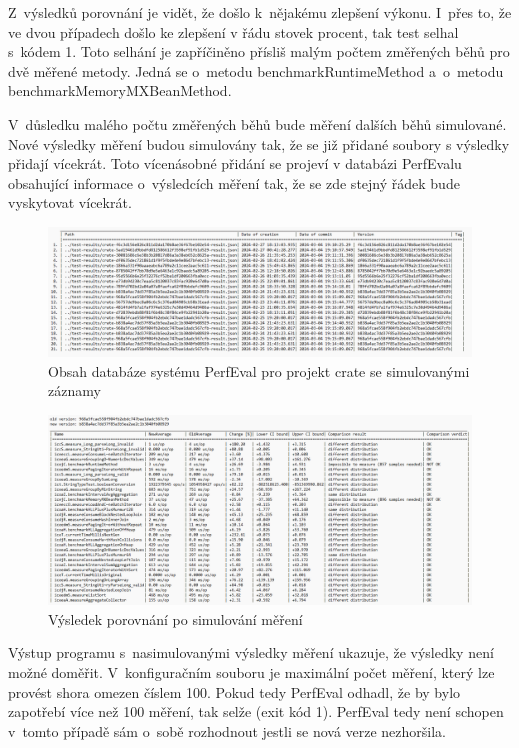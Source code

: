 Z~výsledků porovnání je vidět, že došlo k~nějakému zlepšení výkonu. I~přes to, že
ve dvou případech došlo ke zlepšení v řádu stovek procent, tak test selhal s~kódem 1.
Toto selhání je zapříčiněno přísliš malým počtem změřených běhů pro dvě měřené metody.
Jedná se o~metodu benchmarkRuntimeMethod a~o~metodu benchmarkMemoryMXBeanMethod.

V~důsledku malého počtu změřených běhů bude měření dalších běhů simulované. Nové
výsledky měření budou simulovány tak, že se již přidané soubory s výsledky přidají vícekrát.
Toto vícenásobné přidání se projeví v databázi PerfEvalu obsahující informace o~výsledcích měření tak,
že se zde stejný řádek bude vyskytovat vícekrát.

\begin{figure}[!ht]
    \centering
    \includegraphics[width=1\textwidth]{../img/list-results-crate2.png}
    \caption{Obsah databáze systému PerfEval pro projekt crate se simulovanými záznamy}
\end{figure}

\begin{figure}[!ht]
    \centering
    \includegraphics[width=1\textwidth]{../img/version-comparison-es.png}
    \caption{Výsledek porovnání po simulování měření}
\end{figure}

Výstup programu s~nasimulovanými výsledky měření ukazuje, že výsledky není možné
doměřit. V~konfiguračním souboru je maximální počet měření, který lze provést shora omezen číslem 100.
Pokud tedy PerfEval odhadl, že by bylo zapotřebí více než 100 měření, tak selže (exit kód 1).
PerfEval tedy není schopen v~tomto případě sám o~sobě rozhodnout jestli se nová verze nezhoršila.

